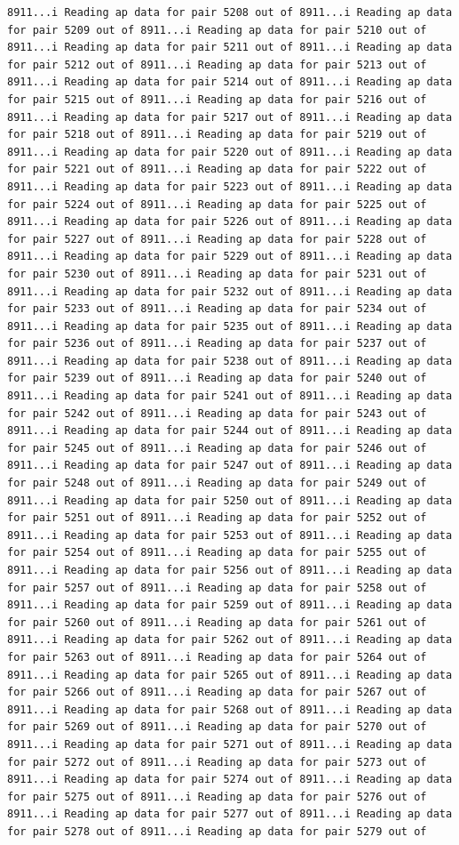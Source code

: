 \documentclass[
]{article}
\begin{document}
\begin{verbatim}
8911...i Reading ap data for pair 5208 out of 8911...i Reading ap data for pair 5209 out of 8911...i Reading ap data for pair 5210 out of 8911...i Reading ap data for pair 5211 out of 8911...i Reading ap data for pair 5212 out of 8911...i Reading ap data for pair 5213 out of 8911...i Reading ap data for pair 5214 out of 8911...i Reading ap data for pair 5215 out of 8911...i Reading ap data for pair 5216 out of 8911...i Reading ap data for pair 5217 out of 8911...i Reading ap data for pair 5218 out of 8911...i Reading ap data for pair 5219 out of 8911...i Reading ap data for pair 5220 out of 8911...i Reading ap data for pair 5221 out of 8911...i Reading ap data for pair 5222 out of 8911...i Reading ap data for pair 5223 out of 8911...i Reading ap data for pair 5224 out of 8911...i Reading ap data for pair 5225 out of 8911...i Reading ap data for pair 5226 out of 8911...i Reading ap data for pair 5227 out of 8911...i Reading ap data for pair 5228 out of 8911...i Reading ap data for pair 5229 out of 8911...i Reading ap data for pair 5230 out of 8911...i Reading ap data for pair 5231 out of 8911...i Reading ap data for pair 5232 out of 8911...i Reading ap data for pair 5233 out of 8911...i Reading ap data for pair 5234 out of 8911...i Reading ap data for pair 5235 out of 8911...i Reading ap data for pair 5236 out of 8911...i Reading ap data for pair 5237 out of 8911...i Reading ap data for pair 5238 out of 8911...i Reading ap data for pair 5239 out of 8911...i Reading ap data for pair 5240 out of 8911...i Reading ap data for pair 5241 out of 8911...i Reading ap data for pair 5242 out of 8911...i Reading ap data for pair 5243 out of 8911...i Reading ap data for pair 5244 out of 8911...i Reading ap data for pair 5245 out of 8911...i Reading ap data for pair 5246 out of 8911...i Reading ap data for pair 5247 out of 8911...i Reading ap data for pair 5248 out of 8911...i Reading ap data for pair 5249 out of 8911...i Reading ap data for pair 5250 out of 8911...i Reading ap data for pair 5251 out of 8911...i Reading ap data for pair 5252 out of 8911...i Reading ap data for pair 5253 out of 8911...i Reading ap data for pair 5254 out of 8911...i Reading ap data for pair 5255 out of 8911...i Reading ap data for pair 5256 out of 8911...i Reading ap data for pair 5257 out of 8911...i Reading ap data for pair 5258 out of 8911...i Reading ap data for pair 5259 out of 8911...i Reading ap data for pair 5260 out of 8911...i Reading ap data for pair 5261 out of 8911...i Reading ap data for pair 5262 out of 8911...i Reading ap data for pair 5263 out of 8911...i Reading ap data for pair 5264 out of 8911...i Reading ap data for pair 5265 out of 8911...i Reading ap data for pair 5266 out of 8911...i Reading ap data for pair 5267 out of 8911...i Reading ap data for pair 5268 out of 8911...i Reading ap data for pair 5269 out of 8911...i Reading ap data for pair 5270 out of 8911...i Reading ap data for pair 5271 out of 8911...i Reading ap data for pair 5272 out of 8911...i Reading ap data for pair 5273 out of 8911...i Reading ap data for pair 5274 out of 8911...i Reading ap data for pair 5275 out of 8911...i Reading ap data for pair 5276 out of 8911...i Reading ap data for pair 5277 out of 8911...i Reading ap data for pair 5278 out of 8911...i Reading ap data for pair 5279 out of 
\end{verbatim}
\end{document}
